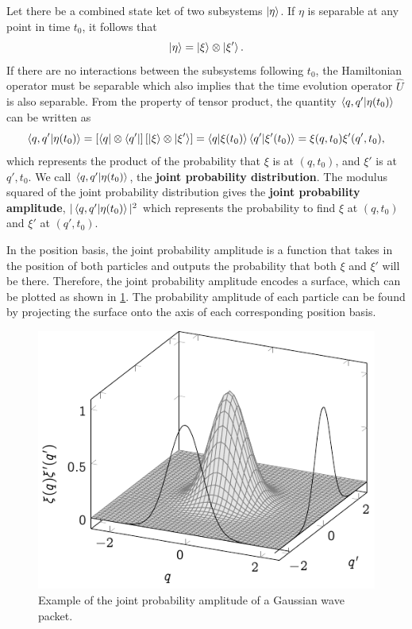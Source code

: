 Let there be a combined state ket of two subsystems $\ket{\eta}$. If $\eta$ is separable at any point in time $t_0$, it follows that
\begin{equation}
    \ket{\eta} = \ket{\xi} \otimes \ket{\xi'}.
\end{equation}
If there are no interactions between the subsystems following $t_0$, the Hamiltonian operator must be separable which also implies that the time evolution operator $\hat{U}$ is also separable. From the property of tensor product, the quantity $\braket{q, q'}{\eta(t_0)}$ can be written as
\begin{equation}
    \braket{q, q'}{\eta(t_0)} = \left[\bra{q} \otimes \bra{q'}\right]\left[\ket{\xi} \otimes \ket{\xi'}\right] = \braket{q}{\xi(t_0)}\braket{q'}{\xi'(t_0)} = \xi(q, t_0)\xi'(q', t_0),
\end{equation}
which represents the product of the probability that $\xi$ is at $(q, t_0)$, and $\xi'$ is at $q', t_0$. We call $\braket{q, q'}{\eta(t_0)}$, the \textbf{joint probability distribution}. The modulus squared of the joint probability distribution gives the \textbf{joint probability amplitude}, $|\braket{q, q'}{\eta(t_0)}|^2$ which represents the probability to find $\xi$ at $(q, t_0)$ and $\xi'$ at $(q', t_0)$.

In the position basis, the joint probability amplitude is a function that takes in the position of both particles and outputs the probability that both $\xi$ and $\xi'$ will be there. Therefore, the joint probability amplitude encodes a surface, which can be plotted as shown in \cref{fig:jpddemonstration}. The probability amplitude of each particle can be found by projecting the surface onto the axis of each corresponding position basis.
\begin{figure}
    \centering
    \includegraphics{diagrams/jpddemonstration}
    \caption{Example of the joint probability amplitude of a Gaussian wave packet.}
    \label{fig:jpddemonstration}
\end{figure}

